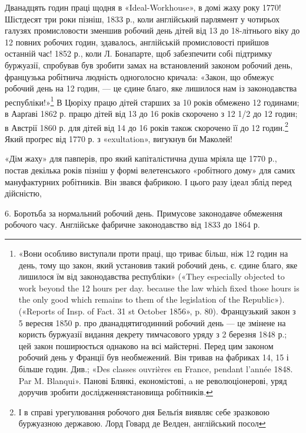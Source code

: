 Дванадцять годин праці щодня в «Ideal-Workhouse», в домі
жаху року 1770! Шістдесят три роки пізніш, 1833 р., коли англійський
парлямент у чотирьох галузях промисловости зменшив
робочий день дітей від 13 до 18-літнього віку до 12 повних робочих
годин, здавалось, англійській промисловості прийшов останній
час! 1852 р., коли Л. Бонапарте, щоб забезпечити собі підтримку
буржуазії, спробував був зробити замах на встановлений
законом робочий день, французька робітнича людність одноголосно
кричала: «Закон, що обмежує робочий день на 12 годин, —
це єдине благо, яке лишилося нам із законодавства республіки!»\footnote{
«Вони особливо виступали проти праці, що триває більш, ніж
12 годин на день, тому що закон, який установив такий робочий день, є.
єдине благо, яке лишилося їм від законодавства республіки» («They especially
objected to work beyond the 12 hours per day. because the law which
fixed those hours is the only good which remains to them of the legislation
of the Republic»). («Reports of Insp. of Fact. 31 st October 1856»,
p. 80). Французький закон з 5 вересня 1850 р. про дванадцятигодинний
робочий день — це змінене на користь буржуазії видання декрету тимчасового
уряду з 2 березня 1848 р.; цей закон поширюється однаково на
всі майстерні. Перед цим законом робочий день у Франції був необмежений.
Він тривав на фабриках 14, 15 і більше годин. Див.; «Des classes
ouvrières en France, pendant l'année 1848. Par M. Blanqui». Панові Блянкі,
економістові, a не революціонерові, уряд доручив зробити дослідженнястановища
робітників.
}
В Цюріху працю дітей старших за 10 років обмежено 12 годинами;
в Аарґаві 1862 р. працю дітей від 13 до 16 років скорочено з 12 1/2
до 12 годин; в Австрії 1860 р. для дітей від 14 до 16 років також
скорочено її до 12 годин.\footnote{
І в справі урегулювання робочого дня Бельґія виявляє себе зразковою
буржуазною державою. Лорд Говард де Велден, англійський посол
} Який проґрес від 1770 р. з «exultation»,
вигукнув би Маколей!

«Дім жаху» для павперів, про який капіталістична душа
мріяла ще 1770 р., постав декілька років пізніш у формі велетенського
«робітного дому» для самих мануфактурних робітників.
Він звався фабрикою. І цього разу ідеал зблід перед дійсністю,

6. Боротьба за нормальний робочий день. Примусове законодавче
обмеження робочого часу. Англійське фабричне законодавство
від 1833 до 1864 р.


